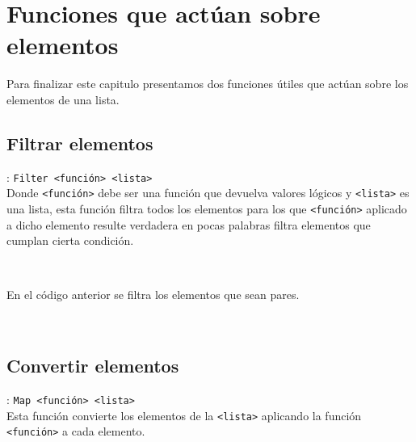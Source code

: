    \section{Funciones que actúan sobre elementos}
      Para finalizar este capitulo presentamos dos funciones útiles que actúan sobre los elementos de una lista.
      
      \subsection*{Filtrar elementos}: \texttt{Filter <función>~<lista>}\\
      Donde \texttt{<función>} debe ser una función que devuelva valores lógicos y \texttt{<lista>} es una lista, esta función filtra todos los elementos para los que \texttt{<función>} aplicado a dicho elemento resulte verdadera en pocas palabras filtra elementos que cumplan cierta condición.
      
      \begin{fxcode}
         \\
         \outcode{[2, 4]}
      \end{fxcode}
      
      En el código anterior se filtra los elementos que sean pares.
      
      \begin{fxcode}
         \\
         \outcode{[0.4]}
      \end{fxcode}
      
      \subsection*{Convertir elementos}: \texttt{Map <función>~<lista>}\\
      Esta función convierte los elementos de la \texttt{<lista>} aplicando la función \texttt{<función>} a cada elemento.
      
      \begin{fxcode}
         \\
         \outcode{[1, 4, 5, 1]}\\
         \\
         \\
         \\
         \outcode{[1, 4, 9]}
      \end{fxcode}
      
   
   
   
   
   
   
   
   
   
   
   
   
